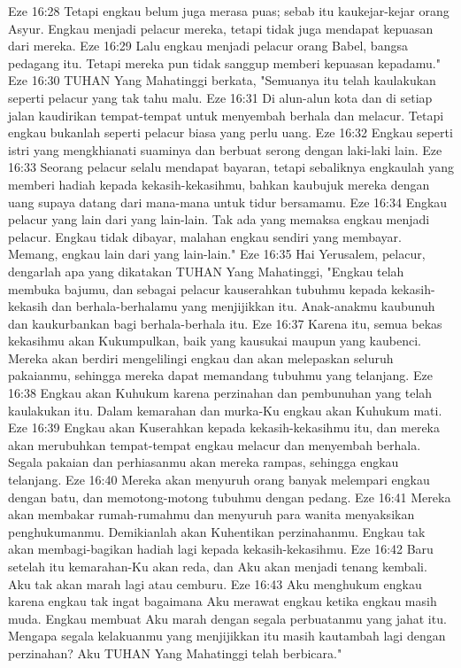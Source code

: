 Eze 16:28  Tetapi engkau belum juga merasa puas; sebab itu kaukejar-kejar orang Asyur. Engkau menjadi pelacur mereka, tetapi tidak juga mendapat kepuasan dari mereka.
Eze 16:29  Lalu engkau menjadi pelacur orang Babel, bangsa pedagang itu. Tetapi mereka pun tidak sanggup memberi kepuasan kepadamu."
Eze 16:30  TUHAN Yang Mahatinggi berkata, "Semuanya itu telah kaulakukan seperti pelacur yang tak tahu malu.
Eze 16:31  Di alun-alun kota dan di setiap jalan kaudirikan tempat-tempat untuk menyembah berhala dan melacur. Tetapi engkau bukanlah seperti pelacur biasa yang perlu uang.
Eze 16:32  Engkau seperti istri yang mengkhianati suaminya dan berbuat serong dengan laki-laki lain.
Eze 16:33  Seorang pelacur selalu mendapat bayaran, tetapi sebaliknya engkaulah yang memberi hadiah kepada kekasih-kekasihmu, bahkan kaubujuk mereka dengan uang supaya datang dari mana-mana untuk tidur bersamamu.
Eze 16:34  Engkau pelacur yang lain dari yang lain-lain. Tak ada yang memaksa engkau menjadi pelacur. Engkau tidak dibayar, malahan engkau sendiri yang membayar. Memang, engkau lain dari yang lain-lain."
Eze 16:35  Hai Yerusalem, pelacur, dengarlah apa yang dikatakan TUHAN Yang Mahatinggi, "Engkau telah membuka bajumu, dan sebagai pelacur kauserahkan tubuhmu kepada kekasih-kekasih dan berhala-berhalamu yang menjijikkan itu. Anak-anakmu kaubunuh dan kaukurbankan bagi berhala-berhala itu.
Eze 16:37  Karena itu, semua bekas kekasihmu akan Kukumpulkan, baik yang kausukai maupun yang kaubenci. Mereka akan berdiri mengelilingi engkau dan akan melepaskan seluruh pakaianmu, sehingga mereka dapat memandang tubuhmu yang telanjang.
Eze 16:38  Engkau akan Kuhukum karena perzinahan dan pembunuhan yang telah kaulakukan itu. Dalam kemarahan dan murka-Ku engkau akan Kuhukum mati.
Eze 16:39  Engkau akan Kuserahkan kepada kekasih-kekasihmu itu, dan mereka akan merubuhkan tempat-tempat engkau melacur dan menyembah berhala. Segala pakaian dan perhiasanmu akan mereka rampas, sehingga engkau telanjang.
Eze 16:40  Mereka akan menyuruh orang banyak melempari engkau dengan batu, dan memotong-motong tubuhmu dengan pedang.
Eze 16:41  Mereka akan membakar rumah-rumahmu dan menyuruh para wanita menyaksikan penghukumanmu. Demikianlah akan Kuhentikan perzinahanmu. Engkau tak akan membagi-bagikan hadiah lagi kepada kekasih-kekasihmu.
Eze 16:42  Baru setelah itu kemarahan-Ku akan reda, dan Aku akan menjadi tenang kembali. Aku tak akan marah lagi atau cemburu.
Eze 16:43  Aku menghukum engkau karena engkau tak ingat bagaimana Aku merawat engkau ketika engkau masih muda. Engkau membuat Aku marah dengan segala perbuatanmu yang jahat itu. Mengapa segala kelakuanmu yang menjijikkan itu masih kautambah lagi dengan perzinahan? Aku TUHAN Yang Mahatinggi telah berbicara."
